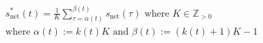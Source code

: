 \begin{equation}
\begin{split}
	&s^{*}_\text{net}(t) = \frac{1}{K}\sum_{\tau=\alpha(t)}^{\beta(t)}s_\text{net}(\tau) \text{ where } K \in \mathbb{Z}_{>0} \\
	&\text{where } \alpha(t) := k(t)K \text{ and } \beta(t) := (k(t)+1)K-1
\end{split}
	\label{ch1:equ:down-sampling-to-half-hourly}
\end{equation}
